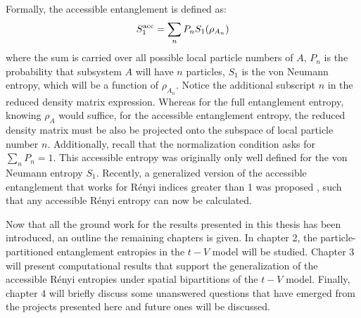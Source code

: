 Formally, the accessible entanglement is defined as:
%
\begin{equation}
\label{eq:accS1}
S_1^{\rm acc} = \sum_n P_n S_1(\rho_{A_{n}})
\end{equation}
%
where the sum is carried over all possible local particle numbers of $A$, $P_n$ is the probability that subsystem $A$ will have $n$ particles, $S_1$ is the von Neumann entropy, which will be a function of $\rho_{A_{n}}$. Notice the additional subscript $n$ in the reduced density matrix expression. Whereas for the full entanglement entropy, knowing $\rho_A$ would suffice, for the accessible entanglement entropy, the reduced density matrix must be also be projected onto the subspace of local particle number $n$. Additionally, recall that the normalization condition asks for $\sum_n P_n = 1$. This accessible entropy was originally only well defined for the von Neumann entropy $S_1$. Recently, a generalized version of the accessible entanglement that works for R\'enyi indices greater than 1 was proposed \cite{Barghathi:2018oe}, such that any accessible R\'enyi entropy can now be calculated.

Now that all the ground work for the results presented in this thesis has been introduced, an outline the remaining chapters is given. In chapter 2, the particle-partitioned entanglement entropies in the $t-V$ model will be studied. Chapter 3 will present computational results that support the generalization of the accessible R\'enyi entropies under spatial bipartitions of the $t-V$ model. Finally, chapter 4 will briefly discuss some unanswered questions that have emerged from the projects presented here and future ones will be discussed.




	

	
